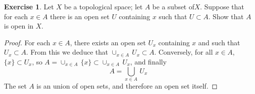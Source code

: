 \documentclass[11pt,a4paper,twoside]{article}
\theoremstyle{definition}
\newcounter{excounter}
\newtheorem{exercise}[excounter]{Exercise}
\begin{document}
\begin{exercise}

  Let $X$ be a topological space; let $A$ be a subset of$X$. Suppose that for each $x \in A$ there is
  an open set $U$ containing $x$ such that $U \subset A$. Show that $A$ is open in $X$.

\end{exercise}

\begin{proof}

  For each $x \in A$, there exists an open set $U_x$ containing $x$ and such that $U_x \subset A$.
  From this we deduce that $\cup_{x \in A} \, U_x \subset A$. Conversely, for all $x \in A$, $\{ x \} \subset U_x$,
  so $A = \cup_{x \in A} \, \{ x \} \subset \cup_{x \in A} \, U_x$, and finally
  \begin{equation*}
    A = \bigcup_{x \in A} \, U_x
  \end{equation*}
  The set $A$ is an union of open sets, and therefore an open set itself.

\end{proof}
\end{document}
